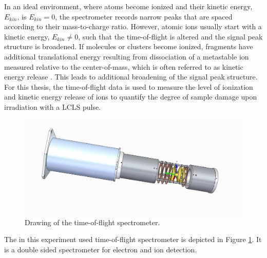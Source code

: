 In an ideal environment, where atoms become ionized and their kinetic energy, $E_{kin}$, is $E_{kin}=0$, the spectrometer records narrow peaks that are spaced according to their mass-to-charge ratio. However, atomic ions usually start with a kinetic energy, $E_{kin}\neq 0$, such that the time-of-flight is altered and the signal peak structure is broadened. If molecules or clusters become ionized, fragments have additional translational energy resulting from dissociation of a metastable ion measured relative to the center-of-mass, which is often referred to as kinetic energy release \citep{Murray-2013-IUPAC}. This leads to additional broadening of the signal peak structure.
For this thesis, the time-of-flight data is used to measure the level of ionization and kinetic energy release of ions to quantify the degree of sample damage upon irradiation with a LCLS pulse.\\[1\baselineskip]
\begin{figure}
   \includegraphics[width=1.\linewidth]{images/spectrometer.jpg}
    \caption{Drawing of the time-of-flight spectrometer.}
\label{fig:spectrometer-detail}
\end{figure}
The in this experiment used time-of-flight spectrometer is depicted in Figure \ref{fig:spectrometer-detail}. It is a double sided spectrometer for electron and ion detection. %
